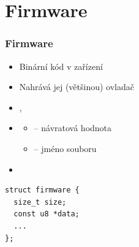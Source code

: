 
\section{Firmware}
\frame{\sectionpage}

\begin{frame}[fragile]
  \frametitle{Firmware}

  \begin{itemize}
  \item Binární kód v zařízení
  \item Nahrává jej (většinou) ovladač
  \end{itemize}

  \bigskip
  \pause

  \begin{itemize}
    \item {}, 
    \item {}
    \begin{itemize}
      \item {} -- návratová hodnota
      \item {} -- jméno souboru
    \end{itemize}

    \item {}
  \end{itemize}

  \bigskip

  \begin{lstlisting}
struct firmware {
  size_t size;
  const u8 *data;
  ...
};
  \end{lstlisting}

\end{frame}

